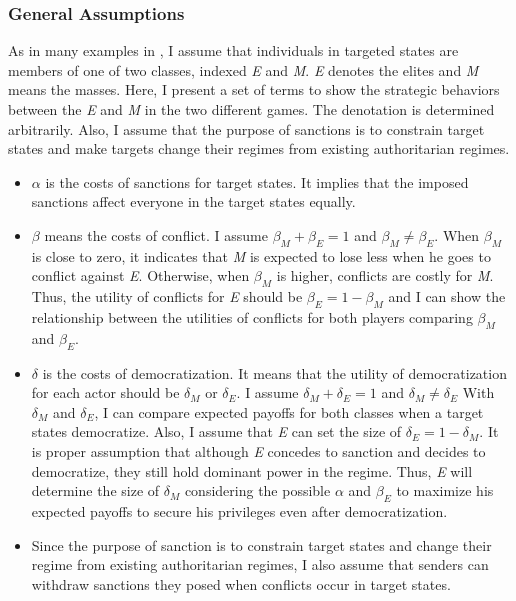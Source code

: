 \documentclass[11pt]{article}
\begin{document}
\subsubsection*{General Assumptions}
As in many examples in \citet{Acemoglu2006a}, I assume that individuals in targeted states are members of one of two classes, indexed \textit{E} and \textit{M}. \textit{E} denotes the elites and \textit{M} means the masses. Here, I present a set of terms to show the strategic behaviors between the \textit{E} and \textit{M} in the two different games. The denotation is determined arbitrarily. Also, I assume that the purpose of sanctions is to constrain target states and make targets change their regimes from existing authoritarian regimes.
	
\begin{itemize}
	\item $\alpha$ is the costs of sanctions for target states. It implies that the imposed sanctions affect everyone in the target states equally.
	\item $\beta$ means the costs of conflict. I assume $ \beta_{M} + \beta_{E} = 1$ and $\beta_{M} \neq \beta_{E}$. When $\beta_{M}$ is close to zero, it indicates that \textit{M} is expected to lose less when he goes to conflict against \textit{E}. Otherwise, when $\beta_{M}$ is higher, conflicts are costly for \textit{M}. Thus, the utility of conflicts for \textit{E} should be $\beta_{E} = 1-\beta_{M}$ and I can show the relationship between the utilities of conflicts for both players comparing $\beta_{M}$ and $\beta_{E}$.
	\item $\delta$ is the costs of democratization. It means that the utility of democratization for each actor should be $\delta_{M}$ or $\delta_{E}$. I assume $\delta_{M} + \delta_{E} = 1$ and $\delta_{M} \neq \delta_{E}$ With $\delta_{M}$ and $\delta_{E}$, I can compare expected payoffs for both classes when a target states democratize. Also, I assume that \textit{E} can set the size of $\delta_{E} = 1-\delta_{M}$. It is proper assumption that although \textit{E} concedes to sanction and decides to democratize, they still hold dominant power in the regime. Thus, \textit{E} will determine the size of $\delta_{M}$ considering the possible $\alpha$ and $\beta_{E}$ to maximize his expected payoffs to secure his privileges even after democratization.
	\item Since the purpose of sanction is to constrain target states and change their regime from existing authoritarian regimes, I also assume that senders can withdraw sanctions they posed when conflicts occur in target states.
\end{itemize}
	
\end{document}

